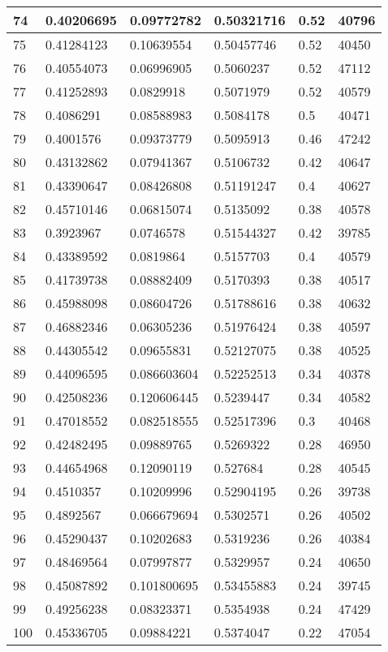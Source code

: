 \begin{longtable}{|l|l|l|l|l|l|}
74 & 0.40206695 & 0.09772782 & 0.50321716 & 0.52 & 40796 \\ \hline 
75 & 0.41284123 & 0.10639554 & 0.50457746 & 0.52 & 40450 \\ \hline 
76 & 0.40554073 & 0.06996905 & 0.5060237 & 0.52 & 47112 \\ \hline 
77 & 0.41252893 & 0.0829918 & 0.5071979 & 0.52 & 40579 \\ \hline 
78 & 0.4086291 & 0.08588983 & 0.5084178 & 0.5 & 40471 \\ \hline 
79 & 0.4001576 & 0.09373779 & 0.5095913 & 0.46 & 47242 \\ \hline 
80 & 0.43132862 & 0.07941367 & 0.5106732 & 0.42 & 40647 \\ \hline 
81 & 0.43390647 & 0.08426808 & 0.51191247 & 0.4 & 40627 \\ \hline 
82 & 0.45710146 & 0.06815074 & 0.5135092 & 0.38 & 40578 \\ \hline 
83 & 0.3923967 & 0.0746578 & 0.51544327 & 0.42 & 39785 \\ \hline 
84 & 0.43389592 & 0.0819864 & 0.5157703 & 0.4 & 40579 \\ \hline 
85 & 0.41739738 & 0.08882409 & 0.5170393 & 0.38 & 40517 \\ \hline 
86 & 0.45988098 & 0.08604726 & 0.51788616 & 0.38 & 40632 \\ \hline 
87 & 0.46882346 & 0.06305236 & 0.51976424 & 0.38 & 40597 \\ \hline 
88 & 0.44305542 & 0.09655831 & 0.52127075 & 0.38 & 40525 \\ \hline 
89 & 0.44096595 & 0.086603604 & 0.52252513 & 0.34 & 40378 \\ \hline 
90 & 0.42508236 & 0.120606445 & 0.5239447 & 0.34 & 40582 \\ \hline 
91 & 0.47018552 & 0.082518555 & 0.52517396 & 0.3 & 40468 \\ \hline 
92 & 0.42482495 & 0.09889765 & 0.5269322 & 0.28 & 46950 \\ \hline 
93 & 0.44654968 & 0.12090119 & 0.527684 & 0.28 & 40545 \\ \hline 
94 & 0.4510357 & 0.10209996 & 0.52904195 & 0.26 & 39738 \\ \hline 
95 & 0.4892567 & 0.066679694 & 0.5302571 & 0.26 & 40502 \\ \hline 
96 & 0.45290437 & 0.10202683 & 0.5319236 & 0.26 & 40384 \\ \hline 
97 & 0.48469564 & 0.07997877 & 0.5329957 & 0.24 & 40650 \\ \hline 
98 & 0.45087892 & 0.101800695 & 0.53455883 & 0.24 & 39745 \\ \hline 
99 & 0.49256238 & 0.08323371 & 0.5354938 & 0.24 & 47429 \\ \hline 
100 & 0.45336705 & 0.09884221 & 0.5374047 & 0.22 & 47054 \\ \hline 
\end{longtable}